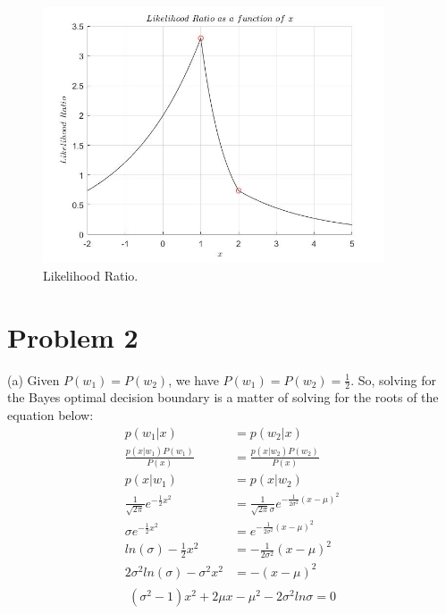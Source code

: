 \documentclass[12pt]{article}
\begin{document}
\begin{figure}[H]
\centering
\includegraphics[width=0.9\textwidth]{11c.jpg}
\caption{\label{fig1}Likelihood Ratio.}
\end{figure}

\section{Problem 2}
(a) Given $P(w_1)=P(w_2)$, we have $P(w_1)=P(w_2)=\frac{1}{2}$. So, solving for the Bayes optimal decision boundary is a matter of solving for the roots of the equation below:\\
\begin{equation*}
\begin{aligned}
p(w_1|x)&=p(w_2|x)\\
\frac{p(x|w_1)P(w_1)}{P(x)} & =\frac{p(x|w_2)P(w_2)}{P(x)}\\
p(x|w_1)&=p(x|w_2)\\
\frac{1}{\sqrt{2\pi}} e^{-\frac{1}{2} x^2} & = \frac{1}{\sqrt{2\pi}\sigma} e^{-\frac{1}{2\sigma^2} (x-\mu)^2} \\
\sigma e^{-\frac{1}{2} x^2} & = e^{-\frac{1}{2\sigma^2} (x-\mu)^2} \\
ln(\sigma)-\frac{1}{2} x^2 & =-\frac{1}{2\sigma^2} (x-\mu)^2 \\
2\sigma^2ln(\sigma)-\sigma^2 x^2 & = -(x-\mu)^2 \\
\end{aligned}
\end{equation*}
\begin{equation*}
(\sigma^2-1)x^2+2\mu x-\mu^2-2\sigma^2ln\sigma =0
\end{equation*}
\end{document}
